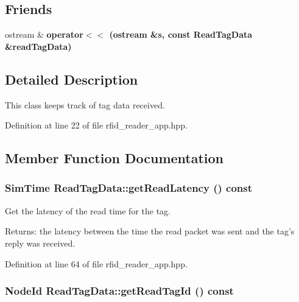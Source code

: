 \subsection*{Friends}
\begin{CompactItemize}
\item 
ostream \& \bf{operator$<$$<$} (ostream \&s, const \bf{Read\-Tag\-Data} \&read\-Tag\-Data)\label{classReadTagData_7e440858f5c08073fa8e0e645a18d293}

\end{CompactItemize}


\subsection{Detailed Description}
This class keeps track of tag data received. 



Definition at line 22 of file rfid\_\-reader\_\-app.hpp.

\subsection{Member Function Documentation}
\subsubsection{\setlength{\rightskip}{0pt plus 5cm}\bf{Sim\-Time} Read\-Tag\-Data::get\-Read\-Latency () const\hspace{0.3cm}{\tt  [inline]}}\label{classReadTagData_5dc744cf05c73ed5961b5fe9787ca14c}


Get the latency of the read time for the tag. 

\begin{Desc}
\item[Returns:]the latency between the time the read packet was sent and the tag's reply was received. \end{Desc}


Definition at line 64 of file rfid\_\-reader\_\-app.hpp.
\subsubsection{\setlength{\rightskip}{0pt plus 5cm}\bf{Node\-Id} Read\-Tag\-Data::get\-Read\-Tag\-Id () const\hspace{0.3cm}{\tt  [inline]}}\label{classReadTagData_421f227fba4cd563546c3454a2baeb95}


